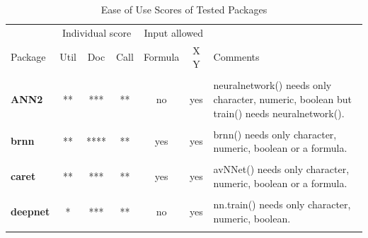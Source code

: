 \begin{Schunk}
\begin{table}

\caption{\label{tab:EaseOfUse}Ease of Use Scores of Tested Packages}
\centering
\fontsize{7}{9}\selectfont
\begin{tabular}[t]{>{}lccccc>{\raggedright\arraybackslash}p{30em}}
\toprule
\multicolumn{1}{c}{ } & \multicolumn{3}{c}{Individual score} & \multicolumn{2}{c}{Input allowed} & \multicolumn{1}{c}{ } \\
\cmidrule(l{3pt}r{3pt}){2-4} \cmidrule(l{3pt}r{3pt}){5-6}
Package & Util & Doc & Call & Formula & X Y & Comments\\
\midrule
\cellcolor{gray!6}{\textbf{AMORE}} & \cellcolor{gray!6}{*} & \cellcolor{gray!6}{***} & \cellcolor{gray!6}{*} & \cellcolor{gray!6}{no} & \cellcolor{gray!6}{yes} & \cellcolor{gray!6}{train() needs a call to newff() for model specification.}\\
\textbf{ANN2} & ** & *** & ** & no & yes & neuralnetwork() needs only character, numeric, boolean but train() needs neuralnetwork().\\
\cellcolor{gray!6}{\textbf{automl}} & \cellcolor{gray!6}{*} & \cellcolor{gray!6}{***} & \cellcolor{gray!6}{*} & \cellcolor{gray!6}{no} & \cellcolor{gray!6}{yes} & \cellcolor{gray!6}{automl\_train\_manual() needs a list for model specification.}\\
\textbf{brnn} & ** & **** & ** & yes & yes & brnn() needs only character, numeric, boolean or a formula.\\
\cellcolor{gray!6}{\textbf{CaDENCE}} & \cellcolor{gray!6}{**} & \cellcolor{gray!6}{***} & \cellcolor{gray!6}{*} & \cellcolor{gray!6}{no} & \cellcolor{gray!6}{yes} & \cellcolor{gray!6}{cadence.fit() needs a list, numeric, boolean.}\\
\textbf{caret} & ** & *** & ** & yes & yes & avNNet() needs only character, numeric, boolean or a formula.\\
\cellcolor{gray!6}{\textbf{deepdive}} & \cellcolor{gray!6}{**} & \cellcolor{gray!6}{***} & \cellcolor{gray!6}{**} & \cellcolor{gray!6}{no} & \cellcolor{gray!6}{yes} & \cellcolor{gray!6}{deepnet() needs only character, numeric, boolean.}\\
\textbf{deepnet} & * & *** & ** & no & yes & nn.train() needs only character, numeric, boolean.\\
\cellcolor{gray!6}{\textbf{elmNNRcpp}} & \cellcolor{gray!6}{**} & \cellcolor{gray!6}{***} & \cellcolor{gray!6}{**} & \cellcolor{gray!6}{no} & \cellcolor{gray!6}{yes} & \cellcolor{gray!6}{elm\_train() needs only character, numeric, boolean.}\\

\end{tabular}
\end{table}
\end{Schunk}

